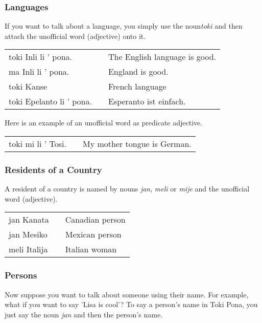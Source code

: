 %
\newpage
\subsubsection*{Languages}
%
If you want to talk about a language, you simply use the noun\textit{toki} and then attach the unofficial word (adjective) onto it.

\begin{supertabular}{p{5,5cm}|ll}
    toki Inli li ' pona.     &  & The English language is good. \\
    ma Inli li ' pona.       &  & England is good.              \\
    toki Kanse               &  & French language               \\
    toki Epelanto li ' pona. &  & Esperanto ist einfach.        \\
\end{supertabular}

Here is an example of an unofficial word as predicate adjective.

\begin{supertabular}{p{5,5cm}|ll}
    toki mi li ' Tosi. &  & My mother tongue is German. \\
\end{supertabular}

%
\subsubsection*{Residents of a Country}
%
A resident of a country is named by nouns \textit{jan}, \textit{meli} or \textit{mije} and the unofficial word (adjective).

\begin{supertabular}{p{5,5cm}|ll}
    jan Kanata   &  & Canadian person \\
    jan Mesiko   &  & Mexican person  \\
    meli Italija &  & Italian woman   \\
\end{supertabular}

%
\subsubsection*{Persons}
%
Now suppose you want to talk about someone using their name.
For example, what if you want to say 'Lisa is cool'?
To say a person's name in Toki Pona, you just say the noun \textit{jan} and then the person's name.

